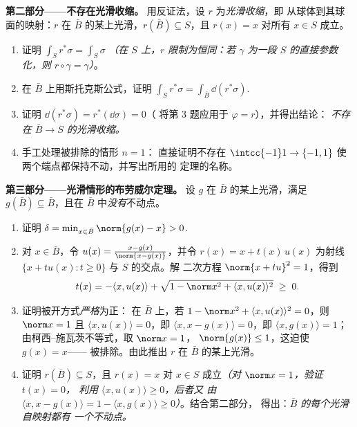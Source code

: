 \begin{problem}
\medskip
\noindent\textbf{第二部分——不存在光滑收缩。} 用反证法，设
$r$ 为\emph{光滑收缩}，即
从球体到其球面的映射：$r$ 在
$\bar B$ 的某上光滑，$r(\bar B) \subseteq S$，且 $r(x) = x$ 对所有
$x \in S$ 成立。
\begin{enumerate}[resume]
  \item 证明 $\int_Sr^*\sigma = \int_S\sigma$
        \emph{（在 $S$ 上，$r$ 限制为恒同：若
        $\gamma$ 为一段
        $S$ 的直接参数化，则 $r\circ\gamma = \gamma$）}。
  \item 在 $\bar B$ 上用斯托克斯公式，证明 $\int_Sr^*\sigma =
        \int_{\bar B}\dd(r^*\sigma)$.
  \item 证明 $\dd(r^*\sigma) = r^*(\dd\sigma) = 0$（
        将第 3 题应用于 $\varphi = r$），并得出结论：
        \emph{不存在 $\bar B \to S$ 的光滑收缩。}
  \item 手工处理被排除的情形 $n = 1$：
        直接证明不存在 $\intcc{-1}1 \to
        \{-1, 1\}$ 使两个端点都保持不动，并写出所用的
        定理的名称。
\end{enumerate}

\medskip
\noindent\textbf{第三部分——光滑情形的布劳威尔定理。} 设 $g$
在 $\bar B$ 的某上光滑，满足 $g(\bar B)
\subseteq \bar B$，且在 $\bar B$ 中\emph{没有}不动点。
\begin{enumerate}[resume]
  \item 证明 $\delta = \min_{x\in\bar B}\norm{g(x) - x} >
        0$.
  \item 对 $x \in \bar B$，令 $u(x) = \frac{x -
        g(x)}{\norm{x - g(x)}}$，并令 $r(x) = x +
        t(x)\,u(x)$ 为射线
        $\{x + tu(x) : t \geq 0\}$ 与 $S$ 的交点。解
        二次方程 $\norm{x + tu}^2 = 1$，得到
        \[
        t(x) = -\langle x, u(x)\rangle +
        \sqrt{1 - \norm x^2 + \langle x, u(x)\rangle^2}
        \;\geq\; 0 .
        \]
  \item 证明被开方式\emph{严格}为正：
        在 $\bar B$ 上，若 $1 - \norm x^2 + \langle x,
        u(x)\rangle^2 = 0$，则 $\norm x = 1$ 且 $\langle
        x, u(x)\rangle = 0$，即 $\langle x, x -
        g(x)\rangle = 0$，即 $\langle x, g(x)\rangle =
        1$；由柯西–施瓦茨不等式，取 $\norm x = 1$，
        $\norm{g(x)} \leq 1$，这迫使 $g(x) = x$——
        被排除。由此推出 $r$ 在
        $\bar B$ 的某上光滑。
  \item 证明 $r(\bar B) \subseteq S$，且 $r(x) = x$ 对 $x
        \in S$ 成立\emph{（对 $\norm x = 1$，验证 $t(x) = 0$，
        利用 $\langle x, u(x)\rangle \geq 0$，后者又
        由 $\langle x, x - g(x)\rangle = 1 -
        \langle x, g(x)\rangle \geq 0$）}。结合第二部分，
        得出：\emph{$\bar B$ 的每个光滑自映射都有
        一个不动点。}
\end{enumerate}


\end{problem}
